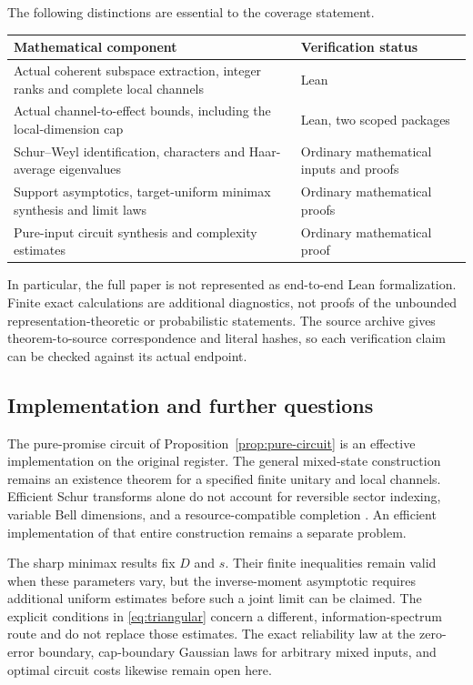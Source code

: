 The following distinctions are essential to the coverage statement.
\begin{center}
\begin{tabular}{>{\raggedright\arraybackslash}p{}>{\raggedright\arraybackslash}p{}}
\toprule
Mathematical component & Verification status\\
\midrule
Actual coherent subspace extraction, integer ranks and complete local channels & Lean\\
Actual channel-to-effect bounds, including the local-dimension cap & Lean, two scoped packages\\
Schur--Weyl identification, characters and Haar-average eigenvalues & Ordinary mathematical inputs and proofs\\
Support asymptotics, target-uniform minimax synthesis and limit laws & Ordinary mathematical proofs\\
Pure-input circuit synthesis and complexity estimates & Ordinary mathematical proof\\
\bottomrule
\end{tabular}
\end{center}
In particular, the full paper is not represented as end-to-end Lean formalization. Finite exact calculations are additional diagnostics, not proofs of the unbounded representation-theoretic or probabilistic statements. The source archive gives theorem-to-source correspondence and literal hashes, so each verification claim can be checked against its actual endpoint.

\subsection{Implementation and further questions}
The pure-promise circuit of Proposition~\ref{prop:pure-circuit} is an effective implementation on the original register. The general mixed-state construction remains an existence theorem for a specified finite unitary and local channels. Efficient Schur transforms alone do not account for reversible sector indexing, variable Bell dimensions, and a resource-compatible completion \cite{bch,kirby,krovi}. An efficient implementation of that entire construction remains a separate problem.

The sharp minimax results fix $D$ and $s$. Their finite inequalities remain valid when these parameters vary, but the inverse-moment asymptotic requires additional uniform estimates before such a joint limit can be claimed. The explicit conditions in \eqref{eq:triangular} concern a different, information-spectrum route and do not replace those estimates. The exact reliability law at the zero-error boundary, cap-boundary Gaussian laws for arbitrary mixed inputs, and optimal circuit costs likewise remain open here.

